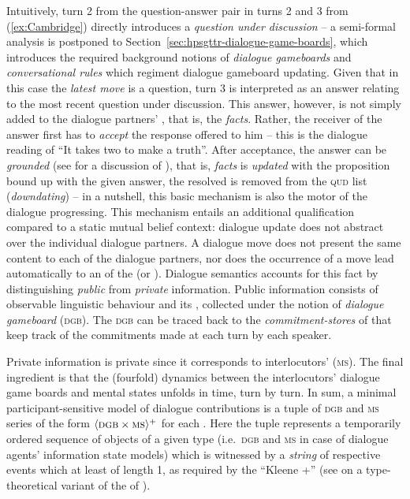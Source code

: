 \documentclass[output=paper
 	        ,biblatex
                ,babelshorthands
                ,newtxmath
                ,draftmode
                ,colorlinks, citecolor=brown
]{langscibook}
\begin{document}
Intuitively, turn 2 from the question-answer pair in turns 2 and 3 from (\ref{ex:Cambridge}) directly introduces a \emph{question under discussion} -- a semi-formal analysis is postponed to Section~\ref{sec:hpsgttr-dialogue-game-boards}, which introduces the required background notions of \emph{dialogue gameboards} and \emph{conversational rules} which regiment dialogue gameboard updating.
%
Given that in this case the \emph{latest move} is a question, turn 3 is interpreted as an answer relating to the most recent question under discussion.
%
This answer, however, is not simply added to the dialogue partners' , that is, the \emph{facts}.
%
Rather, the receiver of the answer first has to \emph{accept}  the response offered to him -- this is the dialogue reading of \enquote{It takes two to make a truth}.
%
After acceptance, the answer can be \emph{grounded}  (see \citealt[Chapter 4]{Clark:1996} for a discussion of ), that is, \emph{facts} is \emph{updated}  with the proposition bound up with the given answer, the resolved  is removed from the \textsc{qud} list (\emph{downdating})  -- in a nutshell, this basic mechanism is also the motor of the dialogue progressing. 
%
This mechanism entails an additional qualification compared to a static mutual belief context: dialogue update does not abstract over the individual dialogue partners.
%
A dialogue move does not present the same content to each of the dialogue partners, nor does the occurrence of a move lead automatically to an  of the  (or ).
%
Dialogue semantics accounts for this fact by distinguishing \emph{public}  from \emph{private} information.  
%
Public information consists of observable linguistic behaviour and its , collected under the notion of \emph{dialogue gameboard} (\textsc{dgb}). 
%
The \textsc{dgb} can be traced back to the \emph{commitment-stores}  of \citet{Hamblin:1970} that keep track of the commitments made at each turn by each speaker. 

Private information is private since it corresponds to interlocutors'  (\textsc{ms}).
%
The final ingredient is that the (fourfold) dynamics between the interlocutors' dialogue game boards and mental states unfolds in time, turn by turn.
%
In sum, a minimal participant-sensitive model of dialogue contributions is a tuple of \textsc{dgb} and \textsc{ms} series of the form $\langle \textsc{dgb} \times \textsc{ms} \rangle^+$ for each . 
%
Here the tuple represents a temporarily ordered sequence of objects of a given type (i.e.\ \textsc{dgb} and \textsc{ms} in case of dialogue agents' information state models)  which is witnessed by a \emph{string}  of respective events which at least of length 1, as required by the \enquote{Kleene +} \is{+}  (see \citealt[Section 2.7]{Cooper:Ginzburg:2015} on a type-theoretical variant of the  of \citealt{Fernando:2011}).
\end{document}
